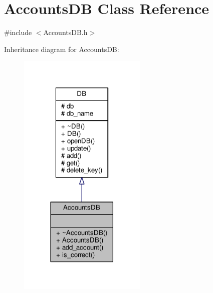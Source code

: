 \hypertarget{classAccountsDB}{}\section{Accounts\+DB Class Reference}
\label{classAccountsDB}


{\ttfamily \#include $<$Accounts\+D\+B.\+h$>$}



Inheritance diagram for Accounts\+DB\+:\nopagebreak
\begin{figure}[H]
\begin{center}
\leavevmode
\includegraphics[width=173pt]{db/dd3/classAccountsDB__inherit__graph}
\end{center}
\end{figure}


